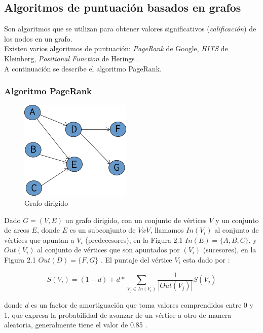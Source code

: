 \subsection{Algoritmos de puntuaci\'on basados en grafos}
Son algoritmos que se utilizan para obtener valores significativos
(\emph{calificaci\'on}) de los nodos en un grafo. \\

Existen varios algoritmos de puntuaci\'on: \emph{PageRank} de Google,
\emph{HITS} de Kleinberg, \emph{Positional Function} de Herings \cite{RM04}. \\

A continuaci\'on se describe el algoritmo PageRank.

\subsubsection{Algoritmo PageRank}
\begin{figure}
	\centering
		\includegraphics[]{recursos/img/grafoDirigido.png}
		\caption {Grafo dirigido}
\end{figure}

Dado $G=(V,E)$ un grafo dirigido, con un conjunto de v\'ertices $V$ y un conjunto
de arcos $E$, donde $E$ es un subconjunto de $V x V$, llamamos $In(V_i)$ al
conjunto de v\'ertices que apuntan a $V_i$ (predecesores),  en la Figura 2.1
$In(E)=\{A,B,C\}$, y $Out(V_i)$ al conjunto de v\'ertices que son apuntados por $(V_i)$
(sucesores), en la Figura 2.1 $Out(D)=\{F,G\}$ . El puntaje del v\'ertice $V_i$ 
esta dado por \cite{SBLP98}:

\begin{equation}
	S(V_i) = (1 - d) + d * \sum_{V_j\in In(V_i)}{\frac{1}{|Out(V_j)|}S(V_j)}
\end{equation}

donde $d$ es un factor de amortiguaci\'on que toma valores comprendidos entre
0 y 1, que expresa la probabilidad de avanzar de un v\'ertice a otro de manera
aleatoria, generalmente tiene el valor de 0.85 \cite{SBLP98}.

